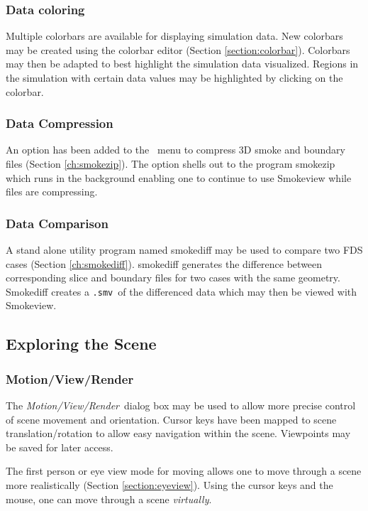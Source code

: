 \documentclass[11pt,twoside]{book}
\begin{document}
\subsubsection{Data coloring} Multiple colorbars are available for displaying simulation data.
New colorbars may be created using the colorbar editor (Section \ref{section:colorbar}).  Colorbars may then be adapted to best highlight the simulation data visualized.
Regions in the simulation with certain data values may be highlighted by clicking on the colorbar.

\subsubsection{Data Compression} An option has been added to the
\ menu to compress 3D smoke and boundary
files (Section \ref{ch:smokezip}). The option shells out to the program smokezip which runs in
the background enabling one to continue to use Smokeview while
files are compressing.

\subsubsection{Data Comparison} A stand alone utility program named smokediff may be used to compare two FDS cases (Section \ref{ch:smokediff}).  smokediff generates the difference between corresponding slice and boundary files for two cases with the same geometry.  Smokediff creates a {\tt .smv}\ of the differenced data which may then be viewed with Smokeview.


\subsection{Exploring the Scene}

\subsubsection{Motion/View/Render} The {\em Motion/View/Render}\ dialog box may be used to
allow more precise control of scene movement and orientation.
Cursor keys have been mapped to scene translation/rotation to
allow easy navigation within the scene.  Viewpoints may be saved for later access.

The first person or eye view mode for moving
allows one to move through a scene more
realistically (Section \ref{section:eyeview}).  Using the cursor keys and the
mouse, one can move through a scene {\em virtually}.
\end{document}

